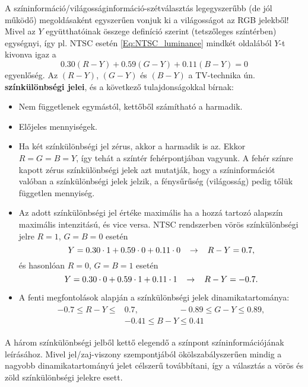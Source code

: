 A színinformáció/világosságinformáció-szétválasztás legegyszerűbb (de jól működő) megoldásaként egyszerűen vonjuk ki a világosságot az RGB jelekből!
Mivel az $Y$ együtthatóinak összege definíció szerint (tetszőleges színtérben) egységnyi, így pl. NTSC esetén \eqref{Eq:NTSC_luminance} mindkét oldalából $Y$-t kivonva igaz a 
\begin{equation} 
   0.30 ( R - Y ) + 0.59 ( G - Y )  + 0.11 ( B - Y )  = 0 
   \label{eq:chrominances}
\end{equation}
egyenlőség.
Az $ ( R - Y ) $, $ ( G - Y ) $ és $ ( B - Y ) $ a TV-technika ún. \textbf{színkülönbségi jelei}, és a következő tulajdonságokkal bírnak:
\begin{itemize}
\item Nem függetlenek egymástól, kettőből számítható a harmadik.
\item Előjeles mennyiségek.
\item Ha két színkülönbségi jel zérus, akkor a harmadik is az.
Ekkor $R = G = B = Y$, így tehát a színtér fehérpontjában vagyunk.
A fehér színre kapott zérus színkülönbségi jelek azt mutatják, hogy a színinformációt valóban a színkülönbségi jelek jelzik, a fénysűrűség (világosság) pedig tőlük független mennyiség.
\item Az adott színkülönbségi jel értéke maximális ha a hozzá tartozó alapszín maximális intenzitású, és vice versa.
NTSC rendszerben vörös színkülönbségi jelre $R = 1$, $G = B= 0$ esetén
\begin{equation}
Y = 0.30 \cdot 1 + 0.59 \cdot 0 + 0.11 \cdot 0 \hspace{3mm }\rightarrow \hspace{3mm } R - Y  = 0.7,
\end{equation}
és hasonlóan $R=0$, $G = B = 1$ esetén
\begin{equation}
Y = 0.30 \cdot 0+ 0.59 \cdot 1 + 0.11 \cdot 1 \hspace{3mm }\rightarrow \hspace{3mm } R - Y  = -0.7.
\end{equation}
\item A fenti megfontolások alapján a színkülönbségi jelek dinamikatartománya:
\begin{align}
\begin{split}
-0.7 \leq R-Y \leq& 0.7 , \hspace{2cm} -0.89 \leq G-Y \leq 0.89, \\
 &-0.41 \leq B-Y \leq 0.41
\end{split}
\end{align}
\end{itemize}
A három színkülönbségi jelből kettő elegendő a színpont színinformációjának leírásához.
Mivel jel/zaj-viszony szempontjából ökölszabályszerűen mindig a nagyobb dinamikatartományú jelet célszerű továbbítani, így a választás a vörös és zöld színkülönbségi jelekre esett.

